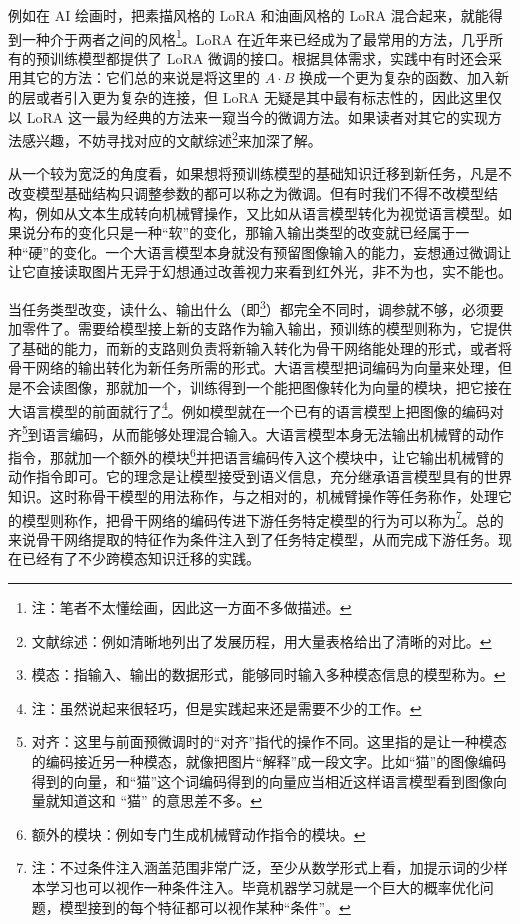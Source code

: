 例如在 AI 绘画时，把素描风格的 LoRA 和油画风格的 LoRA 混合起来，就能得到一种介于两者之间的风格\footnote{注：笔者不太懂绘画，因此这一方面不多做描述。}。LoRA 在近年来已经成为了最常用的方法，几乎所有的预训练模型都提供了 LoRA 微调的接口。根据具体需求，实践中有时还会采用其它的方法：它们总的来说是将这里的 $A\cdot B$ 换成一个更为复杂的函数、加入新的层或者引入更为复杂的连接，但 LoRA 无疑是其中最有标志性的，因此这里仅以 LoRA 这一最为经典的方法来一窥当今的微调方法。如果读者对其它的实现方法感兴趣，不妨寻找对应的文献综述\footnote{文献综述：例如清晰地列出了发展历程，用大量表格给出了清晰的对比。}来加深了解。

从一个较为宽泛的角度看，如果想将预训练模型的基础知识迁移到新任务，凡是不改变模型基础结构只调整参数的都可以称之为微调。但有时我们不得不改模型结构，例如从文本生成转向机械臂操作，又比如从语言模型转化为视觉语言模型。如果说分布的变化只是一种“软”的变化，那输入输出类型的改变就已经属于一种“硬”的变化。一个大语言模型本身就没有预留图像输入的能力，妄想通过微调让让它直接读取图片无异于幻想通过改善视力来看到红外光，非不为也，实不能也。

当任务类型改变，读什么、输出什么（即\footnote{模态：指输入、输出的数据形式，能够同时输入多种模态信息的模型称为。}）都完全不同时，调参就不够，必须要加零件了。需要给模型接上新的支路作为输入输出，预训练的模型则称为，它提供了基础的能力，而新的支路则负责将新输入转化为骨干网络能处理的形式，或者将骨干网络的输出转化为新任务所需的形式。大语言模型把词编码为向量来处理，但是不会读图像，那就加一个，训练得到一个能把图像转化为向量的模块，把它接在大语言模型的前面就行了\footnote{注：虽然说起来很轻巧，但是实践起来还是需要不少的工作。}。例如模型就在一个已有的语言模型上把图像的编码对齐\footnote{对齐：这里与前面预微调时的“对齐”指代的操作不同。这里指的是让一种模态的编码接近另一种模态，就像把图片“解释”成一段文字。比如“猫”的图像编码得到的向量，和“猫”这个词编码得到的向量应当相近这样语言模型看到图像向量就知道这和 “猫” 的意思差不多。}到语言编码，从而能够处理混合输入。大语言模型本身无法输出机械臂的动作指令，那就加一个额外的模块\footnote{额外的模块：例如专门生成机械臂动作指令的模块。}并把语言编码传入这个模块中，让它输出机械臂的动作指令即可。它的理念是让模型接受到语义信息，充分继承语言模型具有的世界知识。这时称骨干模型的用法称作，与之相对的，机械臂操作等任务称作，处理它的模型则称作，把骨干网络的编码传进下游任务特定模型的行为可以称为\footnote{注：不过条件注入涵盖范围非常广泛，至少从数学形式上看，加提示词的少样本学习也可以视作一种条件注入。毕竟机器学习就是一个巨大的概率优化问题，模型接到的每个特征都可以视作某种“条件”。}。总的来说骨干网络提取的特征作为条件注入到了任务特定模型，从而完成下游任务。现在已经有了不少跨模态知识迁移的实践。

